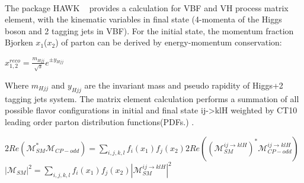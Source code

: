 \paragraph{} The package HAWK ~\cite{HAWK_2015} provides a calculation for VBF and VH process matrix element, with the kinematic variables in final state (4-momenta of the Higgs boson and 2 tagging jets in VBF). For the initial state, the momentum fraction Bjorken $x_1$($x_2$)  of parton can be derived by energy-momentum conservation: 

\begin{center}
\begin{math}
x_{1,2}^{reco}=\frac{m_{Hjj}}{\sqrt{s}}e^{\pm y_{Hjj}}
\end{math}
\end{center}

Where $m_{Hjj}$ and $y_{Hjj}$ are the invariant mass and pseudo rapidity of Higgs+2 tagging jets system. The matrix element calculation performs a summation of all possible flavor configurations in initial and final state ij->klH weighted by CT10 leading order parton distribution functions(PDFs.) . 

\begin{center}
\begin{math}
2Re(\mathcal{M}^{\ast}_{SM}\mathcal{M}_{CP-odd}) = \sum_{i,j,k,l} f_i(x_1)f_j(x_2)2Re((\mathcal{M}_{SM}^{ij \to klH})^{\ast} \mathcal{M}_{CP-odd}^{ij\to klH} ) 
\end{math}
\\
\begin{math}
|\mathcal{M}_{SM}|^2 = \sum_{i,j,k,l} f_i(x_1)f_j(x_2)|\mathcal{M}_{SM}^{ij \to klH}|^2
\end{math}
\end{center}




